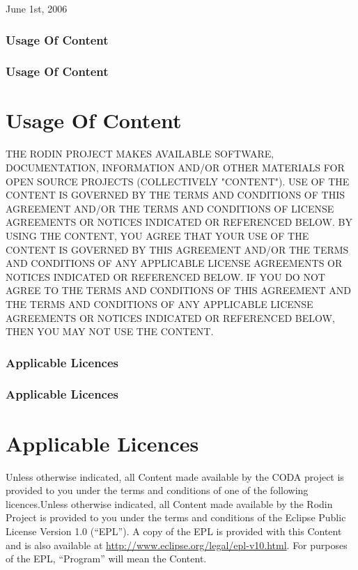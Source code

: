 June 1st, 2006

\ifplastex
\subsubsection{Usage Of Content}
\label{sec:usage-content}
\else
  \ifstandalone
  \subsubsection{Usage Of Content}
  \label{sec:usage-content}
  \else
  \section{Usage Of Content}
  \label{sec:usage-content}
  \fi
\fi

THE RODIN PROJECT MAKES AVAILABLE SOFTWARE, DOCUMENTATION, INFORMATION AND/OR OTHER MATERIALS FOR OPEN SOURCE PROJECTS (COLLECTIVELY "CONTENT"). USE OF THE CONTENT IS GOVERNED BY THE TERMS AND CONDITIONS OF THIS AGREEMENT AND/OR THE TERMS AND CONDITIONS OF LICENSE AGREEMENTS OR NOTICES INDICATED OR REFERENCED BELOW. BY USING THE CONTENT, YOU AGREE THAT YOUR USE OF THE CONTENT IS GOVERNED BY THIS AGREEMENT AND/OR THE TERMS AND CONDITIONS OF ANY APPLICABLE LICENSE AGREEMENTS OR NOTICES INDICATED OR REFERENCED BELOW. IF YOU DO NOT AGREE TO THE TERMS AND CONDITIONS OF THIS AGREEMENT AND THE TERMS AND CONDITIONS OF ANY APPLICABLE LICENSE AGREEMENTS OR NOTICES INDICATED OR REFERENCED BELOW, THEN YOU MAY NOT USE THE CONTENT.

\ifplastex
\subsubsection{Applicable Licences}
\label{sec:applicable-licences}
\else
  \ifstandalone
  \subsubsection{Applicable Licences}
  \label{sec:applicable-licences}
  \else
  \section{Applicable Licences}
  \label{sec:applicable-licences}
  \fi
\fi
 
Unless otherwise indicated, all Content made available by the CODA
project is provided to you under the terms and conditions of one of
the following licences.Unless otherwise indicated, all Content made available by the Rodin Project is provided to you under the terms and conditions of the Eclipse Public License Version 1.0 (``EPL''). A copy of the EPL is provided with this Content and is also available at \url{http://www.eclipse.org/legal/epl-v10.html}. For purposes of the EPL, ``Program'' will mean the Content.

